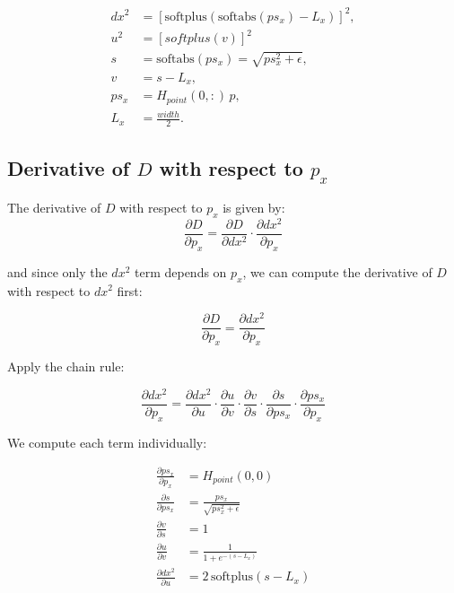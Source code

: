 \documentclass[11pt]{article}
\begin{document}
        \begin{align}
            dx^2 &= \left[\text{softplus}(\text{softabs}(ps_x) - L_x)\right]^2,\\
            u^2 &= [softplus(v)]^2 \\
            s &= \text{softabs}(ps_{x}) = \sqrt{ps_{x}^2 + \epsilon}, \\
            v &= s - L_x, \\
            ps_{x} &= H_{point}(0,:)\, p, \\
            L_x &= \frac{width}{2}.
        \end{align}

        \subsection*{Derivative of $D$ with respect to $p_x$}

            The derivative of \(D\) with respect to \(p_x\) is given by:
            \begin{equation}
                \frac{\partial D}{\partial p_x} = \frac{\partial D}{\partial dx^2} \cdot \frac{\partial dx^2}{\partial p_x}
            \end{equation}

            and since only the \(dx^2\) term depends on \(p_x\), we can compute the derivative of \(D\) with respect to \(dx^2\) first:

            \begin{equation}
                \frac{\partial D}{\partial p_x} = \frac{\partial dx^2}{\partial p_x}
            \end{equation}

            Apply the chain rule:
            
            \begin{equation}
                \frac{\partial dx^2}{\partial p_x}
                = \frac{\partial dx^2}{\partial u}
                \cdot \frac{\partial u}{\partial v}
                \cdot \frac{\partial v}{\partial s}
                \cdot \frac{\partial s}{\partial ps_{x}}
                \cdot \frac{\partial ps_{x}}{\partial p_x}
            \end{equation}
            
            We compute each term individually:

            \begin{align}
                \frac{\partial ps_{x}}{\partial p_x} &= H_{point}(0,0) \\
                \frac{\partial s}{\partial ps_{x}} &= \frac{ps_{x}}{\sqrt{ps_{x}^2 + \epsilon}}\\
                \frac{\partial v}{\partial s} &= 1\\
                \frac{\partial u}{\partial v} &= \frac{1}{1 + e^{-(s - L_x)}}\\
                \frac{\partial dx^2}{\partial u} &= 2\,\text{softplus}(s - L_x)\\
            \end{align}
\end{document}
